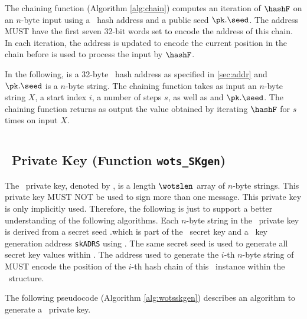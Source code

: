 The chaining function (Algorithm \ref{alg:chain}) computes an iteration of $\hashF$ on an $n$-byte input using
a \WOTSCS\ hash address \ADRS and a public seed $\pk.\seed$. The address \ADRS MUST
have the first seven 32-bit words set to encode the address of this chain. In each iteration, the address is updated to encode the current position in the chain before \ADRS is used to process the input by $\hashF$.

In the following, \ADRS is a 32-byte \WOTSCS\ hash address as specified in \cref{sec:addr} and $\pk.\seed$ is a $n$-byte string. The chaining function takes as input an $n$-byte string $X$, a start index $i$, a number of steps $s$, as well as \ADRS and $\pk.\seed$. The chaining function returns as output the value obtained by iterating $\hashF$ for $s$ times on input $X$.

\begin{algorithm}
\inputminted[breaklines,linenos,tabsize=2,mathescape,escapeinside=||]{C}{paper/code/chain.cs}
\caption{{\tt chain} --- Chaining function used in \WOTSCS.}
\label{alg:chain}
\end{algorithm}


\subsection{\WOTSCS\ Private Key (Function \texttt{wots\_SKgen})}

The \WOTSCS\ private key, denoted by \sk, is a length $\wotslen$ array of $n$-byte strings. This private key MUST NOT be used to sign more than one message. This private key is only implicitly used. Therefore, the following is just to support a better understanding of the following algorithms. Each $n$-byte string in the \WOTSCS\ private key is derived from a secret seed \sk.\seed which is part of the \SPHINCSA\ secret key and a \WOTSCS\ key generation address \texttt{skADRS} using \PRF. The same secret seed is used to generate all secret key values within \SPHINCSA. The address used to generate the $i$-th $n$-byte string of \sk MUST encode the position of the $i$-th hash chain of this \WOTSCS\ instance within the \SPHINCSA\ structure. 

The following pseudocode (Algorithm \ref{alg:wotsskgen}) describes an algorithm to generate a \WOTSCS\ private key.

\begin{algorithm}
\inputminted[breaklines,linenos,tabsize=2,mathescape,escapeinside=||]{C}{paper/code/wots_SKgen.cs}
\caption{\texttt{wots\_SKgen} --- Generating a \WOTSCS\ private key.}
\label{alg:wotsskgen}
\end{algorithm}

